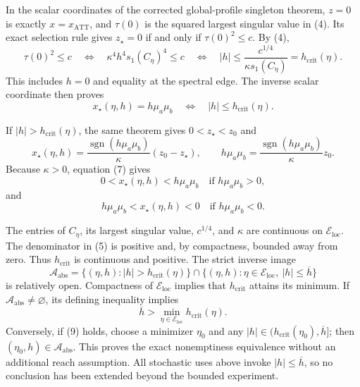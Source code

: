 In the scalar coordinates of the corrected global-profile singleton theorem, \(z=0\) is exactly \(x=x_{\operatorname{ATT}}\), and \(\tau(0)\) is the squared largest singular value in (4).  Its exact selection rule gives \(z_\star=0\) if and only if \(\tau(0)^2\leq c\).  By (4),
\[
 \tau(0)^2\leq c
 \quad\Longleftrightarrow\quad
 \kappa^4h^4s_1(C_\eta)^4\leq c
 \quad\Longleftrightarrow\quad
 |h|\leq\frac{c^{1/4}}{\kappa s_1(C_\eta)}
 =h_{\mathrm{crit}}(\eta). \tag{5}
\]
This includes \(h=0\) and equality at the spectral edge.  The inverse scalar coordinate then proves
\[
 x_\star(\eta,h)=h\mu_a\mu_b
 \quad\Longleftrightarrow\quad
 |h|\leq h_{\mathrm{crit}}(\eta). \tag{6}
\]

If \(|h|>h_{\mathrm{crit}}(\eta)\), the same theorem gives \(0<z_\star<z_0\) and
\[
 x_\star(\eta,h)
 =\frac{\operatorname{sgn}(h\mu_a\mu_b)}\kappa(z_0-z_\star),
 \qquad
 h\mu_a\mu_b
 =\frac{\operatorname{sgn}(h\mu_a\mu_b)}\kappa z_0. \tag{7}
\]
Because \(\kappa>0\), equation (7) gives
\[
 0<x_\star(\eta,h)<h\mu_a\mu_b
 \quad\text{if }h\mu_a\mu_b>0,
\]
and
\[
 h\mu_a\mu_b<x_\star(\eta,h)<0
 \quad\text{if }h\mu_a\mu_b<0. \tag{8}
\]

The entries of \(C_\eta\), its largest singular value, \(c^{1/4}\), and \(\kappa\) are continuous on \(\mathcal E_{\mathrm{loc}}\).  The denominator in (5) is positive and, by compactness, bounded away from zero.  Thus \(h_{\mathrm{crit}}\) is continuous and positive.  The strict inverse image
\[
 \mathcal A_{\mathrm{abs}}
 =\{(\eta,h):|h|>h_{\mathrm{crit}}(\eta)\}
 \cap\{(\eta,h):\eta\in\mathcal E_{\mathrm{loc}},\ |h|\leq\overline h\}
\]
is relatively open.  Compactness of \(\mathcal E_{\mathrm{loc}}\) implies that \(h_{\mathrm{crit}}\) attains its minimum.  If \(\mathcal A_{\mathrm{abs}}\neq\varnothing\), its defining inequality implies
\[
 \overline h>\min_{\eta\in\mathcal E_{\mathrm{loc}}}h_{\mathrm{crit}}(\eta). \tag{9}
\]
Conversely, if (9) holds, choose a minimizer \(\eta_0\) and any \(|h|\in(h_{\mathrm{crit}}(\eta_0),\overline h]\); then \((\eta_0,h)\in\mathcal A_{\mathrm{abs}}\).  This proves the exact nonemptiness equivalence without an additional reach assumption.  All stochastic uses above invoke \(|h|\leq\overline h\), so no conclusion has been extended beyond the bounded experiment.

